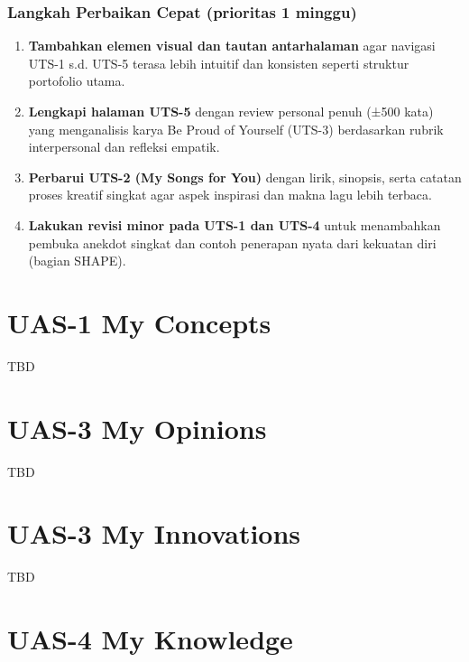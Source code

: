 \documentclass[
  letterpaper,
  DIV=11,
  numbers=noendperiod]{scrreprt}
\providecommand{\tightlist}{%
  \setlength{\itemsep}{0pt}\setlength{\parskip}{0pt}}
\begin{document}
\subsection{Langkah Perbaikan Cepat (prioritas 1
minggu)}\label{langkah-perbaikan-cepat-prioritas-1-minggu}

\begin{enumerate}
\def\labelenumi{\arabic{enumi}.}
\tightlist
\item
  \textbf{Tambahkan elemen visual dan tautan antarhalaman} agar navigasi
  UTS-1 s.d. UTS-5 terasa lebih intuitif dan konsisten seperti struktur
  portofolio utama.
\item
  \textbf{Lengkapi halaman UTS-5} dengan review personal penuh (±500
  kata) yang menganalisis karya Be Proud of Yourself (UTS-3) berdasarkan
  rubrik interpersonal dan refleksi empatik.
\item
  \textbf{Perbarui UTS-2 (My Songs for You)} dengan lirik, sinopsis,
  serta catatan proses kreatif singkat agar aspek inspirasi dan makna
  lagu lebih terbaca.
\item
  \textbf{Lakukan revisi minor pada UTS-1 dan UTS-4} untuk menambahkan
  pembuka anekdot singkat dan contoh penerapan nyata dari kekuatan diri
  (bagian SHAPE).
\end{enumerate}


\chapter{UAS-1 My Concepts}\label{uas-1-my-concepts}

TBD


\chapter{UAS-3 My Opinions}\label{uas-3-my-opinions}

TBD


\chapter{UAS-3 My Innovations}\label{uas-3-my-innovations}

TBD


\chapter{UAS-4 My Knowledge}\label{uas-4-my-knowledge}
\end{document}
